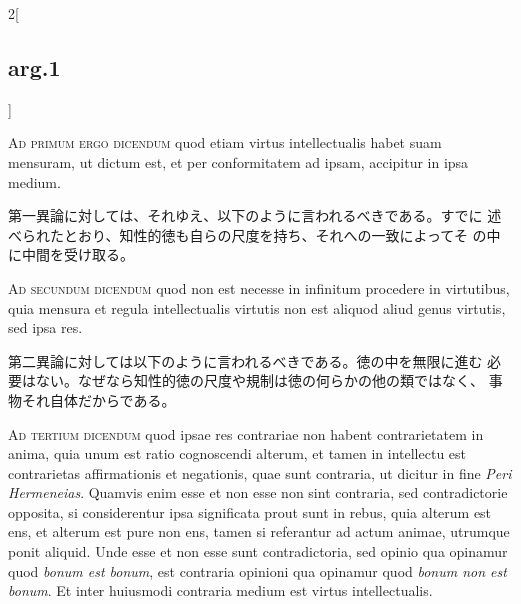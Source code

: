 \documentclass[paper=a4paper,fontsize=10pt,jafontsize=9pt,titlepage]{jlreq}
\begin{document}
\begin{paracol}{2}[\subsection{arg.1}]
\switchcolumn*[\subsection{ad.1}]

{\scshape Ad primum ergo dicendum} quod etiam virtus intellectualis
habet suam mensuram, ut dictum est, et per conformitatem ad ipsam,
accipitur in ipsa medium.

\switchcolumn

第一異論に対しては、それゆえ、以下のように言われるべきである。すでに
 述べられたとおり、知性的徳も自らの尺度を持ち、それへの一致によってそ
 の中に中間を受け取る。

\switchcolumn*[\subsection{ad.2}]

{\scshape Ad secundum dicendum} quod non est necesse in infinitum
procedere in virtutibus, quia mensura et regula intellectualis
virtutis non est aliquod aliud genus virtutis, sed ipsa res.

\switchcolumn

第二異論に対しては以下のように言われるべきである。徳の中を無限に進む
 必要はない。なぜなら知性的徳の尺度や規制は徳の何らかの他の類ではなく、
 事物それ自体だからである。

\switchcolumn*[\subsection{ad.3}]

{\scshape Ad tertium dicendum} quod ipsae res contrariae non habent
contrarietatem in anima, quia unum est ratio cognoscendi alterum, et
tamen in intellectu est contrarietas affirmationis et negationis, quae
sunt contraria, ut dicitur in fine {\itshape Peri Hermeneias}. Quamvis
enim esse et non esse non sint contraria, sed contradictorie opposita,
si considerentur ipsa significata prout sunt in rebus, quia alterum
est ens, et alterum est pure non ens, tamen si referantur ad actum
animae, utrumque ponit aliquid. Unde esse et non esse sunt
contradictoria, sed opinio qua opinamur quod {\itshape bonum est
bonum}, est contraria opinioni qua opinamur quod {\itshape bonum non
est bonum}. Et inter huiusmodi contraria medium est virtus
intellectualis.

\switchcolumn


\end{paracol}
\end{document}
